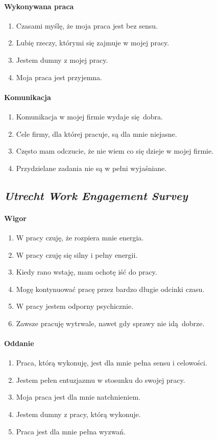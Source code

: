 \paragraph{Wykonywana praca}
\begin{enumerate}
  \item Czasami myślę, że moja praca jest bez sensu.
  \item Lubię rzeczy, którymi się zajmuje w mojej pracy.
  \item Jestem dumny z mojej pracy.
  \item Moja praca jest przyjemna.
\end{enumerate}

\paragraph{Komunikacja}
\begin{enumerate}
  \item Komunikacja w mojej firmie wydaje się dobra.
  \item Cele firmy, dla której pracuje, są dla mnie niejasne.
  \item Często mam odczucie, że nie wiem co się dzieje w mojej firmie.
  \item Przydzielane zadania nie są w pełni wyjaśniane.
\end{enumerate}

\subsection{\emph{Utrecht Work Engagement Survey}}
\label{sec:uwes-text}
\paragraph{Wigor}
\begin{enumerate}
  \item W pracy czuję, że rozpiera mnie energia.
  \item W pracy czuję się silny i pełny energii.
  \item Kiedy rano wstaję, mam ochotę iść do pracy.
  \item Mogę kontynuować pracę przez bardzo długie odcinki czasu.
  \item W pracy jestem odporny psychicznie.
  \item Zawsze pracuję wytrwale, nawet gdy sprawy nie idą dobrze.
\end{enumerate}

\paragraph{Oddanie}
\begin{enumerate}
  \item Praca, którą wykonuję, jest dla mnie pełna sensu i celowości.
  \item Jestem pełen entuzjazmu w stosunku do swojej pracy.
  \item Moja praca jest dla mnie natchnieniem.
  \item Jestem dumny z pracy, którą wykonuje.
  \item Praca jest dla mnie pełna wyzwań.
\end{enumerate}

